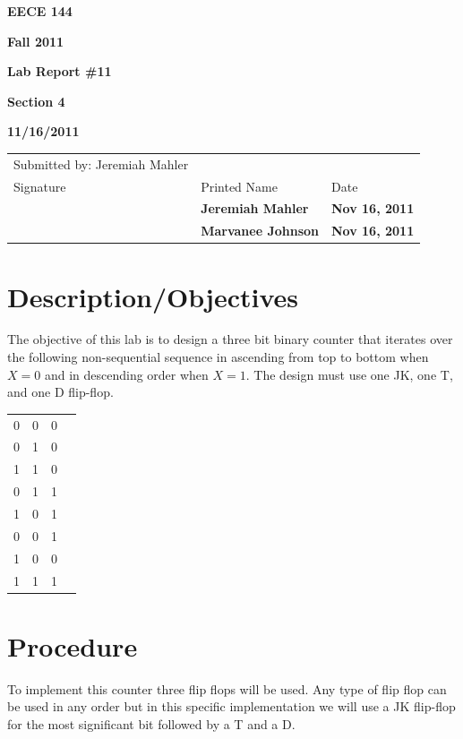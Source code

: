 \documentclass[12pt]{article}
\begin{document}
\centerline{\bf EECE 144}
\centerline{\bf Fall 2011}
\centerline{\bf}
\centerline{\bf Lab Report \#11}
\centerline{\bf Section 4}
\centerline{\bf 11/16/2011}
\begin{center}
\begin{tabularx}{\textwidth}[b]{X l l}
Submitted by: Jeremiah Mahler & & \\
Signature & Printed Name & Date \\
\hline
\multicolumn{1}{|X|}{} & \multicolumn{1}{|l|}{\bigstrut \bf Jeremiah Mahler} & \multicolumn{1}{|l|}{\bf Nov 16, 2011} \\
\hline
\multicolumn{1}{|X|}{} & \multicolumn{1}{|l|}{\bigstrut \bf Marvanee Johnson} & \multicolumn{1}{|l|}{\bf Nov 16, 2011} \\
\hline
\end{tabularx}
\end{center}

\section{Description/Objectives}

The objective of this lab is to design a three bit binary counter
that iterates over the following non-sequential sequence
in ascending from top to bottom when $X = 0$ and in
descending order when $X = 1$.
The design must use one JK, one T, and one D flip-flop.

\begin{center}
\begin{tabular}[t]{cccc}
0 & 0 & 0 \\
0 & 1 & 0 \\
1 & 1 & 0 \\
0 & 1 & 1 \\
1 & 0 & 1 \\
0 & 0 & 1 \\
1 & 0 & 0 \\
1 & 1 & 1 \\
\end{tabular}
\end{center}


\section{Procedure}
\label{sec:procedure}

To implement this counter three flip flops will be used.
Any type of flip flop can be used in any order but in this
specific implementation we will use a JK flip-flop for the
most significant bit followed by a T and a D.
\end{document}

